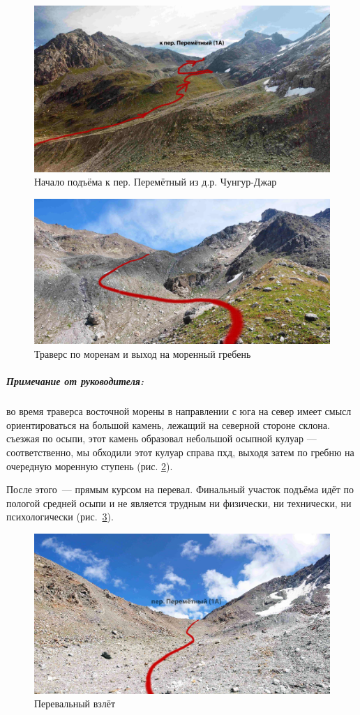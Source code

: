 \begin{figure}[h!]
	\centering
	\includegraphics[width=0.7\linewidth]{../pics/perem_1}
	\caption{Начало подъёма к пер. Перемётный из д.р. Чунгур-Джар}
	\label{fig:perem_1}
\end{figure} 
\begin{figure}[h!]
	\centering
	\includegraphics[width=0.7\linewidth]{../pics/DSC_0280.jpg}
	\caption{Траверс по моренам и выход на моренный гребень}
	\label{fig:DSC_0280}
\end{figure} 

\subparagraph{Примечание от руководителя:} во время траверса восточной морены в направлении с юга на север имеет смысл ориентироваться на большой камень, лежащий на северной стороне склона. съезжая по осыпи, этот камень образовал небольшой осыпной кулуар --- соответственно, мы обходили этот кулуар справа пхд, выходя затем по гребню на очередную моренную ступень (рис. \ref{fig:DSC_0280}).

После этого~--- прямым курсом на перевал. Финальный участок подъёма идёт по пологой средней осыпи и не является трудным ни физически, ни технически, ни психологически (рис.~\ref{fig:DSC_0341}).
\begin{figure}[h!]
	\centering
	\includegraphics[width=0.7\linewidth]{../pics/DSC_0341.jpg}
	\caption{Перевальный взлёт}
	\label{fig:DSC_0341}
\end{figure} 

